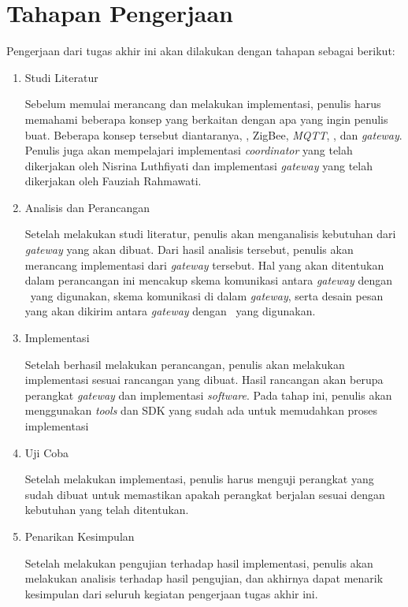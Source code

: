 \section{Tahapan Pengerjaan}
Pengerjaan dari tugas akhir ini akan dilakukan dengan tahapan sebagai berikut:
\begin{enumerate}
	\item Studi Literatur
	
	Sebelum memulai merancang dan melakukan implementasi, penulis harus memahami beberapa konsep yang berkaitan dengan apa yang ingin penulis buat. Beberapa konsep tersebut diantaranya, \iot, ZigBee, \textit{MQTT}, \siot, dan \textit{gateway}. Penulis juga akan mempelajari implementasi \textit{coordinator} yang telah dikerjakan oleh Nisrina Luthfiyati\cite{SkripsiNina} dan implementasi \textit{gateway} yang telah dikerjakan oleh Fauziah Rahmawati\cite{SkripsiFarah}.
	\item Analisis dan Perancangan
	
	Setelah melakukan studi literatur, penulis akan menganalisis kebutuhan dari \textit{gateway} yang akan dibuat. Dari hasil analisis tersebut, penulis akan merancang implementasi dari \textit{gateway} tersebut. Hal yang akan ditentukan dalam perancangan ini mencakup skema komunikasi antara \textit{gateway} dengan \plat~yang digunakan, skema komunikasi di dalam \textit{gateway}, serta desain pesan yang akan dikirim antara \textit{gateway} dengan \plat~yang digunakan.
	\item Implementasi
	
	Setelah berhasil melakukan perancangan, penulis akan melakukan implementasi sesuai rancangan yang dibuat. Hasil rancangan akan berupa perangkat \textit{gateway} dan implementasi \textit{software}. Pada tahap ini, penulis akan menggunakan \textit{tools} dan SDK yang sudah ada untuk memudahkan proses implementasi
	\item Uji Coba
	
	Setelah melakukan implementasi, penulis harus menguji perangkat yang sudah dibuat untuk memastikan apakah perangkat berjalan sesuai dengan kebutuhan yang telah ditentukan.
	\item Penarikan Kesimpulan
	
	Setelah melakukan pengujian terhadap hasil implementasi, penulis akan melakukan analisis terhadap hasil pengujian, dan akhirnya dapat menarik kesimpulan dari seluruh kegiatan pengerjaan tugas akhir ini.
\end{enumerate}

